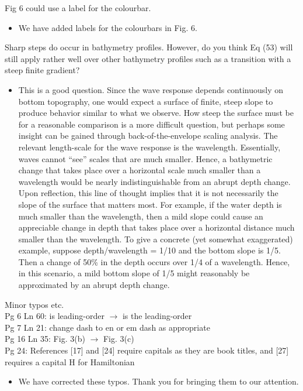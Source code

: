 \documentclass[11pt]{article}
\newcommand{\comment}[1]{{\color{blue} #1}}
\begin{document}
\noindent
\comment{Fig 6 could use a label for the colourbar.}

\begin{itemize}
\item We have added  labels for the colourbars in Fig. 6.
\end{itemize}

\noindent
\comment{Sharp steps do occur in bathymetry profiles. However, do you think Eq (53) will still apply rather well over other bathymetry profiles such as a transition with a steep finite gradient?}
\begin{itemize}
\item This is a good question. Since the wave response depends continuously on bottom topography, one would expect a surface of finite, steep slope to produce behavior similar to what we observe. How steep the surface must be for a reasonable comparison is a more difficult question, but perhaps some insight can be gained through back-of-the-envelope scaling analysis. The relevant length-scale for the wave response is the wavelength. Essentially, waves cannot ``see'' scales that are much smaller. Hence, a bathymetric change that takes place over a horizontal scale much smaller than a wavelength would be nearly indistinguishable from an abrupt depth change. Upon reflection, this line of thought implies that it is not necessarily the slope of the surface that matters most. For example, if the water depth is much smaller than the wavelength, then a mild slope could cause an appreciable change in depth that takes place over a horizontal distance much smaller than the wavelength. To give a concrete (yet somewhat exaggerated) example, suppose depth/wavelength = 1/10 and the bottom slope is 1/5. Then a change of 50\% in the depth occurs over 1/4 of a wavelength. Hence, in this scenario, a mild bottom slope of 1/5 might reasonably be approximated by an abrupt depth change.
\end{itemize}

\noindent
\comment{Minor typos etc.
\\Pg 6 Ln 60: is leading-order $\to$ is the leading-order %
\\Pg 7 Ln 21: change dash to en or em dash as appropriate %
\\Pg 16 Ln 35: Fig. 3(b) $\to$ Fig. 3(c)%
\\Pg 24: References [17] and [24] require capitals as they are book titles, and [27] requires a capital H for Hamiltonian %
}
\begin{itemize}
\item We have corrected these typos. Thank you for bringing them to our attention.
\end{itemize}
\end{document}
